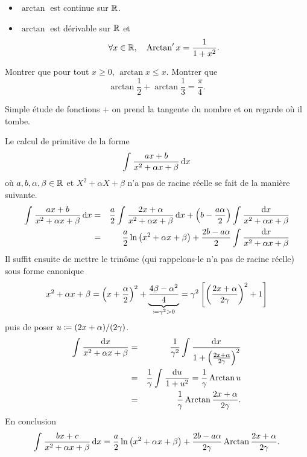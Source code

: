 \documentclass{magnolia}
\begin{document}
\begin{proposition}[utile=-3]
\begin{itemize}
\item $\arctan$ est continue sur $\R$.
\item $\arctan$ est dérivable sur $\R$ et
  \[\forall x\in\R \qsep \arctan' x=\frac{1}{1+x^2}.\]
\end{itemize}
\end{proposition}

\begin{exos}
\exo Montrer que pour tout $x\geq 0$, $\arctan x\leq x$.
\exo Montrer que
  \[\arctan\frac{1}{2}+\arctan\frac{1}{3}=\frac{\pi}{4}.\]
  \begin{sol}
  Simple étude de fonctions + on prend la tangente du nombre et on regarde où il tombe.
  
  \end{sol}
\end{exos}

\begin{remarqueUnique}
\remarque Le calcul de primitive de la forme
\[\prim{\frac{ax+b}{x^2+\alpha x+\beta}}{x}\]
où $a,b,\alpha,\beta\in\R$ et $X^2+\alpha X+\beta$ n'a pas de racine réelle se fait de la manière suivante.
\begin{eqnarray*}
\prim{\frac{ax+b}{x^2+\alpha x+\beta}}{x}
&=& \frac{a}{2}\prim{\frac{2x+\alpha}{x^2+\alpha x+\beta}}{x} + \p{b-\frac{a\alpha}{2}}\priminv{x^2+\alpha x+\beta}{x}\\
&=& \frac{a}{2}\ln\p{x^2+\alpha x+\beta}+\frac{2b-a\alpha}{2}\priminv{x^2+\alpha x+\beta}{x}
\end{eqnarray*}
Il suffit ensuite de mettre le trinôme (qui rappelons-le n'a pas de racine réelle) sous forme canonique
\[x^2+\alpha x+\beta = \p{x+\frac{\alpha}{2}}^2+\underbrace{\frac{4\beta - \alpha^2}{4}}_{\defeq \gamma^2>0}=\gamma^2\cro{\p{\frac{2x+\alpha}{2\gamma}}^2+1}\]
puis de poser $u\defeq (2x+\alpha)/(2\gamma)$.
\begin{eqnarray*}
\priminv{x^2+\alpha x+\beta}{x}
	&=& \frac{1}{\gamma^2}\priminv{1+\p{\frac{2x+\alpha}{2\gamma}}^2}{x}\\
	&=& \frac{1}{\gamma}\priminv{1+u^2}{u} = \frac{1}{\gamma}\arctan u\\
	&=& \frac{1}{\gamma}\arctan\frac{2x+\alpha}{2\gamma}.
\end{eqnarray*}
En conclusion
\[\prim{\frac{bx+c}{x^2+\alpha x+\beta}}{x}=\frac{a}{2}\ln\p{x^2+\alpha x+\beta}+\frac{2b-a\alpha}{2\gamma}\arctan\frac{2x+\alpha}{2\gamma}.\]
\end{remarqueUnique}
\end{document}
